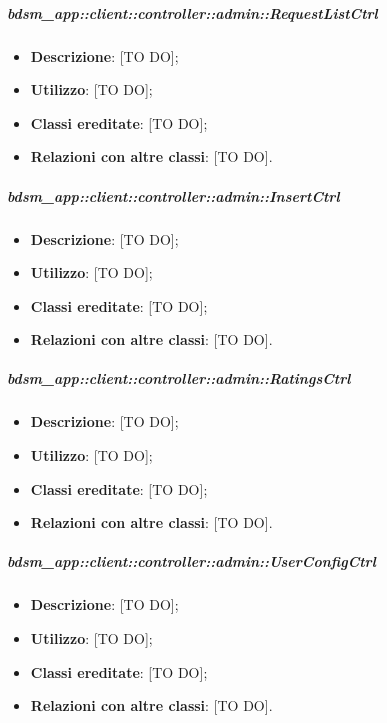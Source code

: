 		\subparagraph{bdsm\_app::client::controller::admin::RequestListCtrl} %
		\label{subp:bdsm_app_client_controller_admin_requestlistctrl}
			\begin{itemize}
				\item \textbf{Descrizione}: [TO DO];
				\item \textbf{Utilizzo}: [TO DO];
				\item \textbf{Classi ereditate}: [TO DO];
				\item \textbf{Relazioni con altre classi}: [TO DO].
			\end{itemize}

		\subparagraph{bdsm\_app::client::controller::admin::InsertCtrl} %
		\label{subp:bdsm_app_client_controller_admin_insertctrl}
			\begin{itemize}
				\item \textbf{Descrizione}: [TO DO];
				\item \textbf{Utilizzo}: [TO DO];
				\item \textbf{Classi ereditate}: [TO DO];
				\item \textbf{Relazioni con altre classi}: [TO DO].
			\end{itemize}

		\subparagraph{bdsm\_app::client::controller::admin::RatingsCtrl} %
		\label{subp:bdsm_app_client_controller_admin_ratingsctrl}
			\begin{itemize}
				\item \textbf{Descrizione}: [TO DO];
				\item \textbf{Utilizzo}: [TO DO];
				\item \textbf{Classi ereditate}: [TO DO];
				\item \textbf{Relazioni con altre classi}: [TO DO].
			\end{itemize}

		\subparagraph{bdsm\_app::client::controller::admin::UserConfigCtrl} %
		\label{subp:bdsm_app_client_controller_admin_userconfigctrl}
			\begin{itemize}
				\item \textbf{Descrizione}: [TO DO];
				\item \textbf{Utilizzo}: [TO DO];
				\item \textbf{Classi ereditate}: [TO DO];
				\item \textbf{Relazioni con altre classi}: [TO DO].
			\end{itemize}


